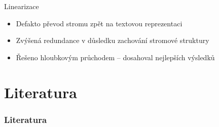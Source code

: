 \documentclass[lualatex,hyperref={pdfencoding=auto}]{beamer}
\begin{document}
\begin{frame}{Linearizace}
  \begin{itemize}
    \item Defakto převod stromu zpět na textovou reprezentaci
    \item Zvýšená redundance v důsledku zachování stromové struktury
    \item Řešeno hloubkovým průchodem -- dosahoval nejlepších výsledků    
  \end{itemize}
\end{frame}

    

\section{Literatura}
\begin{frame}[allowframebreaks]
    \frametitle{Literatura}
    \printbibliography[heading=none]
\end{frame}
\end{document}
